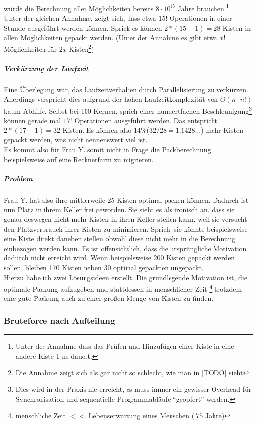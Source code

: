 würde die Berechnung aller Möglichkeiten bereits $8 \cdot 10^{15}$ Jahre brauchen.\footnote{Unter der Annahme dass das Prüfen und Hinzufügen einer Kiste in eine andere Kiste 1 ns dauert.} \\
Unter der gleichen Annahme, zeigt sich, dass etwa $15!$ Operationen in einer Stunde ausgeführt werden können.
Sprich es können $2*(15-1)=28$ Kisten in allen Möglichkeiten gepackt werden.
(Unter der Annahme es gibt etwa $x!$ Möglichkeiten für $2x$ Kisten\footnote{Die Annahme zeigt sich als gar nicht so schlecht, wie man in \ref{TODO} sieht})
\subparagraph{Verkürzung der Laufzeit} Eine Überlegung war, das Laufzeitverhalten durch Parallelisierung zu verkürzen.
Allerdings verspricht dies aufgrund der hohen Laufzeitkomplexität von $O(n \cdot n!)$ kaum Abhilfe.
Selbst bei 100 Kernen, sprich einer hundertfachen Beschleunigung\footnote{Dies wird in der Praxis nie erreicht,
es muss immer ein gewisser Overhead für Synchronisation und sequentielle Programmabläufe ``geopfert'' werden.}
können gerade mal $17!$ Operationen ausgeführt werden. Das entspricht $2*(17-1)=32$ Kisten.
Es können also $14\%$($32/28=1.1428\dots$) mehr Kisten gepackt werden, was nicht nennenswert viel ist. \\
Es kommt also für Frau Y. somit nicht in Frage die Packberechnung beispielsweise auf eine Rechnerfarm zu migrieren. \\
\subparagraph{Problem}
Frau Y. hat also ihre mittlerweile 25 Kisten optimal packen können. Dadurch ist nun Platz in ihrem Keller frei geworden.
Sie sieht es als ironisch an, dass sie genau deswegen nicht mehr Kisten in ihren Keller stellen kann, weil sie versucht den Platzverbrauch ihrer Kisten zu minimieren.
Sprich, sie könnte beispielsweise eine Kiste direkt daneben stellen obwohl diese nicht mehr in die Berechnung einbezogen werden kann.
Es ist offensichtlich, dass die ursprüngliche Motivation dadurch nicht erreicht wird.
Wenn beispielsweise 200 Kisten gepackt werden sollen, bleiben 170 Kisten neben 30 optimal gepackten ungepackt. \\
Hierzu habe ich zwei Lösungsideen erstellt. Die grundlegende Motivation ist,
die optimale Packung aufzugeben und stattdessen in menschlicher Zeit
\footnote{menschliche Zeit $<<$ Lebenserwartung eines Menschen ($~75$ Jahre)} trotzdem eine gute Packung auch zu einer großen Menge von Kisten zu finden.
\subsubsection{Bruteforce nach Aufteilung}
